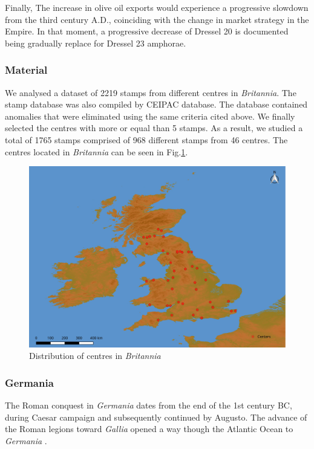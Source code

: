 \documentclass[review]{elsarticle}
\begin{document}
Finally, The increase in olive oil exports would experience a progressive slowdown
from the third century A.D., coinciding with the change in market strategy in the
Empire. In that moment, a progressive decrease of Dressel 20 is documented being gradually replace for Dressel 23 amphorae. 


\subsubsection{Material}

We analysed a dataset of 2219 stamps from different centres in \textit{Britannia}. 
The stamp database was also compiled by CEIPAC database. The database contained anomalies that were eliminated using the same criteria cited above. We finally selected the centres with more or equal than 5 stamps. As a result, we studied a total of 1765 stamps comprised of 968 different stamps from 46 centres.
The centres located in \textit{Britannia} can be seen in Fig.\ref{britannia}.
 
\begin{figure}[htp]
	\centering
\includegraphics[width=\linewidth]{figs/britmap2.pdf}
\caption{Distribution of centres in \textit{Britannia}}
\label{britannia}
\end{figure} 


\subsubsection{Germania}

The Roman conquest in \textit{Germania} dates from the end of the 1st century BC, during Caesar campaign and subsequently continued by Augusto. The advance of the Roman legions toward \textit{Gallia} opened a way though the Atlantic Ocean to \textit{Germania} \citep{remesal_annona_1986,
remesal_baetica_2002}.
\end{document}
